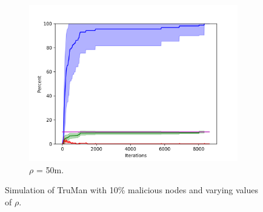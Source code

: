 \begin{figure}
\centering
\begin{subfigure}{0.5\textwidth}
\includegraphics[width=\linewidth]{images/plots/Network_rA_10.0/new_plots/50_10.png}
\caption{$\rho$ = 50m.} 
\label{fig:random50}
\end{subfigure}


\caption{Simulation of TruMan with 10\% malicious nodes and varying values of $\rho$.}
\label{fig:random103050}
\end{figure}

%
%	


%
%

